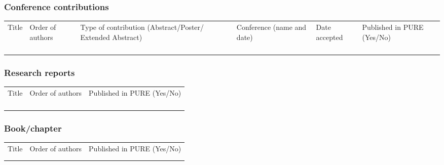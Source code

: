\colorbox{lgray}{
\begin{minipage}[t]{\textwidth}

\end{minipage}}


\subsubsection*{Conference contributions}
{\scriptsize
\begin{tabular}{p{3.5cm}p{3cm}p{2.5cm}p{1.5cm}p{1.5cm}p{1.3cm}}
Title &
\raggedright Order of authors &
\raggedright Type of contribution (Abstract/Poster/ Extended Abstract) &
\raggedright Conference (name and date) &
\raggedright Date accepted &
Published in PURE (Yes/No)\\
\rowcolor[gray]{0.90}               &                   &                    &            &            &    \\
\rowcolor[gray]{0.95}               &                   &                    &            &            &    \\
\rowcolor[gray]{0.90}               &                   &                    &            &            &    \\
\rowcolor[gray]{0.95}               &                   &                    &            &            &    \\
\end{tabular}}

\subsubsection*{Research reports}
{\scriptsize
\begin{tabular}{p{7cm}p{6cm}p{1.5cm}}
Title &
\raggedright Order of authors &
Published in PURE (Yes/No)\\
\rowcolor[gray]{0.90}               &                   &     \\
\rowcolor[gray]{0.95}               &                   &     \\
\rowcolor[gray]{0.90}               &                   &     \\
\rowcolor[gray]{0.95}               &                   &     \\
\end{tabular}}


\subsubsection*{Book/chapter}
{\scriptsize
\begin{tabular}{p{7cm}p{6cm}p{1.5cm}}
Title &
\raggedright Order of authors &
Published in PURE (Yes/No)\\
\rowcolor[gray]{0.90}               &                   &     \\
\rowcolor[gray]{0.95}               &                   &     \\
\end{tabular}}

